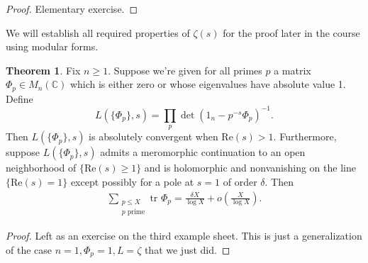 \documentclass{article}
\theoremstyle{definition}
\newtheorem{theorem}{Theorem}[section]
\begin{document}
\begin{proof}
    Elementary exercise.
\end{proof}
We will establish all required properties of $\zeta(s)$ for the proof later in the course using modular forms.
\begin{theorem}\label{theorem4.8}
    Fix $n\ge 1$. Suppose we're given for all primes $p$ a matrix $\Phi_p \in M_n(\mathbb{C})$ which is either zero or whose eigenvalues have absolute value 1. Define $$L(\{\Phi_p\},s) = \prod_{p}^{} \det(1_n - p^{-s}\Phi_p)^{-1}.$$
    Then $L(\{\Phi_p\}, s)$ is absolutely convergent when $\text{Re}(s)>1$. Furthermore, suppose $L(\{\Phi_p\},s)$ admits a meromorphic continuation to an open neighborhood of $\{\text{Re}(s)\ge 1\}$ and is holomorphic and nonvanishing on the line $\{\text{Re}(s)=1\}$ except possibly for a pole at $s=1$ of order $\delta$. Then 
    \begin{align*}
        \sum_{\substack{p\le X\\p \text{ prime}}} \text{tr }\Phi_p = \frac{\delta X}{\log X} + o \left(\frac{X}{\log X}\right).
    \end{align*}
\end{theorem}
\begin{proof}
    Left as an exercise on the third example sheet. This is just a generalization of the case $n=1, \Phi_p = 1, L =\zeta$ that we just did.
\end{proof}
\end{document}
